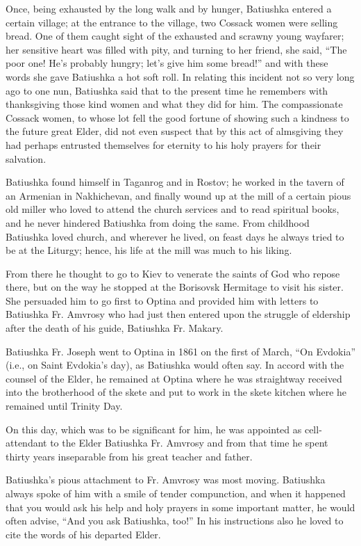 Once, being exhausted by the long walk and by hunger, Batiushka entered a certain village; at the entrance to the village, two Cossack women were selling bread. One of them caught sight of the exhausted and scrawny young wayfarer; her sensitive heart was filled with pity, and turning to her friend, she said, “The poor one! He's probably hungry; let's give him some bread!” and with these words she gave Batiushka a hot soft roll. In relating this incident not so very long ago to one nun, Batiushka said that to the present time he remembers with thanksgiving those kind women and what they did for him. The compassionate Cossack women, to whose lot fell the good fortune of showing such a kindness to the future great Elder, did not even suspect that by this act of almsgiving they had perhaps entrusted themselves for eternity to his holy prayers for their salvation.

Batiushka found himself in Taganrog and in Rostov; he worked in the tavern of an Armenian in Nakhichevan, and finally wound up at the mill of a certain pious old miller who loved to attend the church services and to read spiritual books, and he never hindered Batiushka from doing the same. From childhood Batiushka loved church, and wherever he lived, on feast days he always tried to be at the Liturgy; hence, his life at the mill was much to his liking.

From there he thought to go to Kiev to venerate the saints of God who repose there, but on the way he stopped at the Borisovsk Hermitage to visit his sister. She persuaded him to go first to Optina and provided him with letters to Batiushka Fr. Amvrosy who had just then entered upon the struggle of eldership after the death of his guide, Batiushka Fr. Makary.

Batiushka Fr. Joseph went to Optina in 1861 on the first of March, “On Evdokia” (i.e., on Saint Evdokia's day), as Batiushka would often say. In accord with the counsel of the Elder, he remained at Optina where he was straightway received into the brotherhood of the skete and put to work in the skete kitchen where he remained until Trinity Day.

On this day, which was to be significant for him, he was appointed as cell-attendant to the Elder Batiushka Fr. Amvrosy and from that time he spent thirty years inseparable from his great teacher and father.

Batiushka's pious attachment to Fr. Amvrosy was most moving. Batiushka always spoke of him with a smile of tender compunction, and when it happened that you would ask his help and holy prayers in some important matter, he would often advise, “And you ask Batiushka, too!” In his instructions also he loved to cite the words of his departed Elder.

